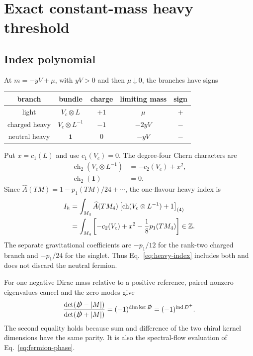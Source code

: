 \documentclass[11pt]{article}
\theoremstyle{definition}
\theoremstyle{remark}
\newcommand{\ZZ}{\mathbb Z}
\newcommand{\ind}{\operatorname{ind}}
\begin{document}
\section{Exact constant-mass heavy threshold}

\subsection{Index polynomial}

At \(m=-yV+\mu\), with \(yV>0\) and then \(\mu\downarrow0\), the branches
have signs
\begin{center}
\begin{tabular}{ccccc}
\toprule
branch & bundle & charge & limiting mass & sign\\
\midrule
light & \(V_c\otimes L\) & \(+1\) & \(\mu\) & \(+\)\\
charged heavy & \(V_c\otimes L^{-1}\) & \(-1\) & \(-2yV\) & \(-\)\\
neutral heavy & \(\bm1\) & \(0\) & \(-yV\) & \(-\)\\
\bottomrule
\end{tabular}
\end{center}
Put \(x=c_1(L)\) and use \(c_1(V_c)=0\).  The degree-four Chern characters
are
\begin{align}
 \operatorname{ch}_2(V_c\otimes L^{-1})
 &=-c_2(V_c)+x^2,
 \label{eq:charged-chern}\\
 \operatorname{ch}_2(\bm1)&=0.
 \label{eq:neutral-chern}
\end{align}
Since \(\widehat A(TM)=1-p_1(TM)/24+\cdots\), the one-flavour heavy index is
\begin{align}
 I_h
 &=\int_{M_4}\widehat A(TM_4)
   \left[\operatorname{ch}(V_c\otimes L^{-1})+1\right]_{(4)}
 \notag\\
 &=\int_{M_4}
 \left[-c_2(V_c)+x^2-\frac18p_1(TM_4)\right]\in\ZZ.
 \label{eq:heavy-index}
\end{align}
The separate gravitational coefficients are \(-p_1/12\) for the rank-two
charged branch and \(-p_1/24\) for the singlet.  Thus
Eq.~\eqref{eq:heavy-index} includes both and does not discard the neutral
fermion.

For one negative Dirac mass relative to a positive reference, paired
nonzero eigenvalues cancel and the zero modes give
\begin{equation}
 \frac{\det(\slashed D-|M|)}{\det(\slashed D+|M|)}
 =(-1)^{\dim\ker\slashed D}
 =(-1)^{\ind D^+}.
 \label{eq:mass-sign-index}
\end{equation}
The second equality holds because sum and difference of the two chiral
kernel dimensions have the same parity.  It is also the spectral-flow
evaluation of Eq.~\eqref{eq:fermion-phase}.
\end{document}

